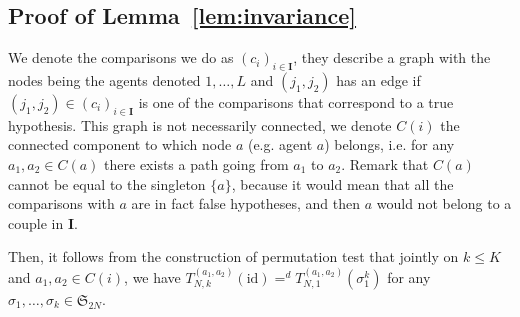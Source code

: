 \documentclass{article}
\theoremstyle{plain}
\theoremstyle{remark}
\renewcommand{\S}{\mathfrak{S}}
\newcommand{\1}{\mathbbm{1}}
\newcommand{\id}{\mathrm{id}}
\numberwithin{equation}{section}
\begin{document}
\subsection{Proof of Lemma~\ref{lem:invariance}}
We denote the comparisons we do as $(c_i)_{i \in \textbf{I}}$, they describe a graph with the nodes being the agents denoted $1,\dots,L$ and $(j_1,j_2)$ has an edge if $(j_1,j_2)\in(c_i)_{i \in \textbf{I}}$ is one of the comparisons that correspond to a true hypothesis. This graph is not necessarily connected, we denote $C(i)$ the connected component to which node $a$ (e.g. agent $a$) belongs, i.e. for any $a_1,a_2 \in C(a)$ there exists a path going from $a_1$ to $a_2$. Remark that $C(a)$ cannot be equal to the singleton $\{a\}$, because it would mean that all the comparisons with $a$ are in fact false hypotheses, and then $a$ would not belong to a couple in $\textbf{I}$.

Then, it follows from the construction of permutation test that jointly on $k\le K$ and $a_1,a_2 \in C(i)$, we have $T_{N,k}^{(a_1,a_2)}(\id)=^d T_{N,1}^{(a_1,a_2)}(\sigma_1^k)$ for any $\sigma_1,\dots,\sigma_k \in  \S_{2N}$.
\end{document}
